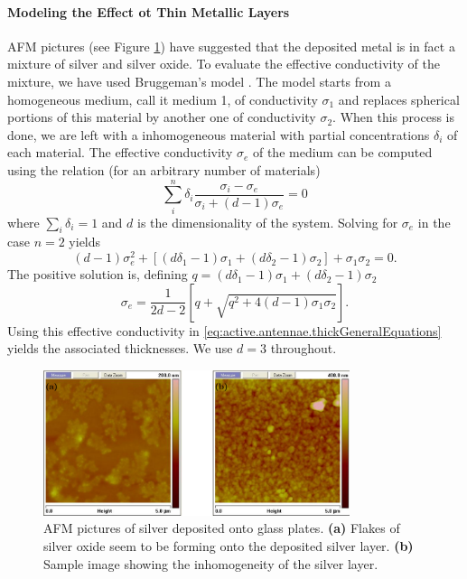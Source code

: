 \paragraph{Modeling the Effect ot Thin Metallic Layers}
AFM pictures (see Figure \ref{fig:active.lcx.AFM})  have suggested that the deposited
metal is in fact a mixture of silver and silver oxide. To evaluate
the effective conductivity of the mixture, we have used Bruggeman's model \cite{LAN1978}.
The model starts from a homogeneous medium, call it medium 1, 
of conductivity $\sigma_1$ and replaces spherical portions of this material 
by another one of conductivity $\sigma_2$. When this process is done, 
we are left with a inhomogeneous material with partial concentrations $\delta_i$
of each material. The effective conductivity $\sigma_e$ of the medium can be computed
using the relation (for an arbitrary number of materials)
  \begin{equation}
    \sum_i^n \delta_i \frac{\sigma_i-\sigma_e}{\sigma_i+(d-1)\sigma_e} =0 
  \end{equation}
where $\sum_i\delta_i=1$ and $d$ is the dimensionality of the system.
Solving for $\sigma_e$ in the case $n=2$ yields
  \begin{equation}
   (d-1)\sigma_e^2+\left[\left(d\delta_1-1\right)\sigma_1+\left(d\delta_2-1\right)\sigma_2\right]+\sigma_1\sigma_2=0.
  \end{equation}
The positive solution is, defining $q=\left(d\delta_1-1\right)\sigma_1+\left(d\delta_2-1\right)\sigma_2$
  \begin{equation}
   \label{eq:antenna:bruggeman}
   \sigma_e = \frac{1}{2d-2}\left[q+\sqrt{q^2+4(d-1)\sigma_1\sigma_2}\right].
  \end{equation}
Using this effective conductivity in \eqref{eq:active.antennae.thickGeneralEquations} yields 
the associated thicknesses. We use $d=3$ throughout.

\begin{figure}
 \centering
 \includegraphics[width=0.8\textwidth]{figs/active/AFM.pdf}
 \caption[AFM pictures of silver deposited onto glass plates]
 		{AFM pictures of silver deposited onto glass plates. \textbf{(a)} Flakes of silver oxide seem to be forming onto the deposited
	  	silver layer. \textbf{(b)} Sample image showing the inhomogeneity of the
	  	silver layer.}
 \label{fig:active.lcx.AFM}
\end{figure}


